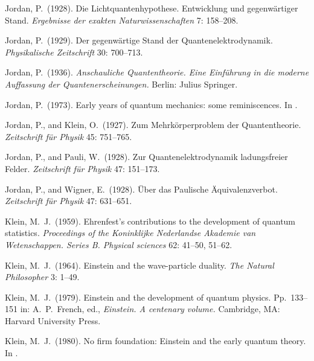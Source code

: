 \documentclass[12pt]{elsart}
\begin{document}
{\begin{thebibliography}{}
 Jordan, P.\  (1928). Die Lichtquantenhypothese. Entwicklung und gegenw\"artiger Stand. {\it Ergebnisse der exakten Naturwissenschaften} 7: 158--208.

 Jordan, P.\  (1929). Der gegenw\"artige Stand der Quantenelektrodynamik. {\it Physikalische Zeitschrift} 30: 700--713.

 Jordan, P.\  (1936). {\it Anschauliche Quantentheorie. Eine Einf\"uhrung in die moderne Auffassung der Quantenerscheinungen.} Berlin: Julius Springer.

 Jordan, P.\  (1973). Early years of quantum mechanics: some reminiscences. In \citep[pp.\ 294--299]{Mehra 1973}. 

 Jordan, P., and Klein, O.\ (1927). Zum Mehrk\"orperproblem der Quantentheorie. {\it Zeitschrift f\"{u}r Physik} 45: 751--765.

 Jordan, P., and Pauli, W.\ (1928). Zur Quantenelektrodynamik ladungsfreier Felder. {\it Zeitschrift f\"{u}r Physik} 47: 151--173.

 Jordan, P., and Wigner, E.\ (1928). \"Uber das Paulische \"Aquivalenzverbot. {\it Zeitschrift f\"{u}r Physik} 47: 631--651.


  Klein, M.\ J.\ (1959). Ehrenfest's contributions to the development of quantum statistics. {\it Proceedings of the Koninklijke Nederlandse Akademie van Wetenschappen. Series B. Physical sciences} 62: 41--50, 51--62.

  Klein, M.\ J.\  (1964). Einstein and the wave-particle duality. {\it The Natural Philosopher} 3: 1--49.


  Klein, M.\ J.\  (1979). Einstein and the development of quantum physics. Pp.\ 133--151 in: A.\ P.\ French, ed., {\it Einstein. A centenary volume.} Cambridge, MA: Harvard University Press.  

  Klein, M.\ J.\  (1980). No firm foundation: Einstein and the early quantum theory. In \citep[pp.\ 161--185]{Woolf 1980}.


\end{thebibliography}}
\end{document}
